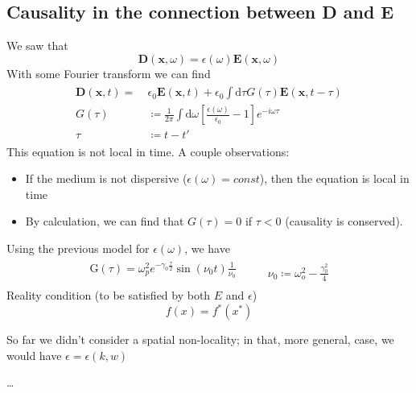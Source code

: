 \documentclass[a4paper, twocolumn]{article}
\newcommand\id{\textrm{d}}
\begin{document}
\subsection{Causality in the connection between D and E}
\label{sec:caus-conn-betw}

We saw that
\begin{equation}
  \label{eq:66}
  \mathbf{D}(\mathbf{x},\omega)=\epsilon(\omega)\mathbf{E}(\mathbf{x},\omega)
\end{equation}
With some Fourier transform we can find
\begin{align}
  \label{eq:67}
  \begin{split}
    \mathbf{D}(\mathbf{x},t)=&~\epsilon_0\mathbf{E}(\mathbf{x},t)+\epsilon_0\int\mathrm{d}\tau G(\tau)\mathbf{E}(\mathbf{x},t-\tau) \\
    G(\tau)&~\coloneqq \frac{1}{2\pi}\int\id \omega\left[\frac{\epsilon(\omega)}{\epsilon_0}-1\right]e^{-i\omega\tau} \\
    \tau&~\coloneqq t-t'
  \end{split}
\end{align}
This equation is not local in time. A couple observations:
\begin{itemize}
\item If the medium is not dispersive ($\epsilon(\omega)=const$), then the equation is local in time
\item By calculation, we can find that $G(\tau)=0$ if $\tau<0$ (causality is conserved).
\end{itemize}
Using the previous model for $\epsilon(\omega)$, we have
\begin{gather}
  \label{eq:69}
  \begin{aligned}
    \mathrm{G}(\tau)=\omega_p^2 e^{-\gamma_0 \frac{\tau}{2}}\sin(\nu_0 t)\frac{1}{\nu_0}\\
  \end{aligned}
  \qquad
  \begin{aligned}
    \nu_0\coloneqq \omega_o^2 - \frac{\gamma_0^2}{4}
  \end{aligned}
\end{gather}
Reality condition (to be satisfied by both $E$ and $\epsilon$)
\begin{equation}
  \label{eq:70}
  f(x)=f^*(x^*)
\end{equation}


So far we didn't consider a spatial non-locality; in that, more general, case, we would have $\epsilon=\epsilon(k,w)$

\dots
\end{document}
